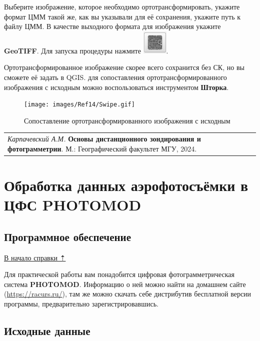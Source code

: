 \documentclass[
  12pt,
]{book}
\begin{document}
Выберите изображение, которое необходимо ортотрансформировать, укажите формат ЦММ такой же, как вы указывали для её сохранения, укажите путь к файлу ЦММ. В качестве выходного формата для изображения укажите \textbf{GeoTIFF}. Для запуска процедуры нажмите \includegraphics{images/Ref14/Run.png}.

Ортотрансформированное изображение скорее всего сохранится без СК, но вы сможете её задать в QGIS. для сопоставления ортотрансформированного изображения с исходным можно воспользоваться инструментом \textbf{Шторка}.

\begin{figure}
\centering
\texttt{[image: images/Ref14/Swipe.gif]}
\caption{Сопоставление ортотрансформированного изображения с исходным}
\end{figure}

\begin{longtable}[]{@{}l@{}}
\toprule\noalign{}
\endhead
\bottomrule\noalign{}
\endlastfoot
\emph{Карпачевский А.М.} \textbf{Основы дистанционного зондирования и фотограмметрии}. М.: Географический факультет МГУ, 2024. \\
\end{longtable}

\hypertarget{photomod}{%
\chapter{Обработка данных аэрофотосъёмки в ЦФС PHOTOMOD}\label{photomod}}

\hypertarget{photomod-soft}{%
\section{Программное обеспечение}\label{photomod-soft}}

\protect\hyperlink{photomod}{В начало справки ⇡}

Для практической работы вам понадобится цифровая фотограмметрическая система \textbf{PHOTOMOD}. Информацию о ней можно найти на домашнем сайте (\url{https://racurs.ru/}), там же можно скачать себе дистрибутив бесплатной версии программы, предварительно зарегистрировавшись.

\hypertarget{photomod-initial}{%
\section{Исходные данные}\label{photomod-initial}}
\end{document}
